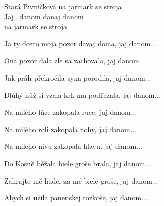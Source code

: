 
\ve{}
Stará Pivničková
na jarmark se stroja\\
Jaj \ danom danaj danom\\
na jarmark se stroja

\ve{}
Ja ty dcero moja pozor davaj doma, jaj danom...

\ve{}
Ona pozor dala zle sa zachovala, jaj danom...
 
\ve{}
Jak práh překročila syna porodila, jaj danom...

\ve{}
Dlúhý nůž si vzala krk mu podřezala, jaj danom...
 
\ve{}
Na milého lúce zakopala ruce, jaj danom...

\ve{}
Na milého roli zakopala nohy, jaj danom...

\ve{}
Na mileho nivu zakopala hlavu. jaj danom...
 
\ve{}
Do Kosně běžala biele groše brala, jaj danom...

\ve{}
Zahrajte mě hudci za mé biele groše, jaj danom...

\ve{}
Abych si užila panenskej rozkoše, jaj danom...

\esong